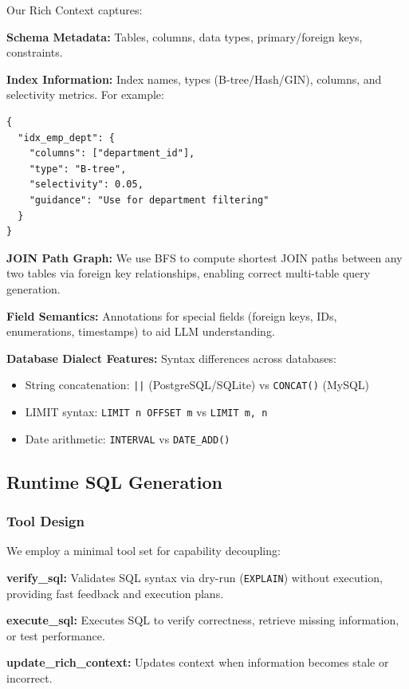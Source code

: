 Our Rich Context captures:

\textbf{Schema Metadata:} Tables, columns, data types, primary/foreign keys, constraints.

\textbf{Index Information:} Index names, types (B-tree/Hash/GIN), columns, and selectivity metrics. For example:
\begin{verbatim}
{
  "idx_emp_dept": {
    "columns": ["department_id"],
    "type": "B-tree",
    "selectivity": 0.05,
    "guidance": "Use for department filtering"
  }
}
\end{verbatim}

\textbf{JOIN Path Graph:} We use BFS to compute shortest JOIN paths between any two tables via foreign key relationships, enabling correct multi-table query generation.

\textbf{Field Semantics:} Annotations for special fields (foreign keys, IDs, enumerations, timestamps) to aid LLM understanding.

\textbf{Database Dialect Features:} Syntax differences across databases:
\begin{itemize}
    \item String concatenation: \texttt{||} (PostgreSQL/SQLite) vs \texttt{CONCAT()} (MySQL)
    \item LIMIT syntax: \texttt{LIMIT n OFFSET m} vs \texttt{LIMIT m, n}
    \item Date arithmetic: \texttt{INTERVAL} vs \texttt{DATE\_ADD()}
\end{itemize}

\subsection{Runtime SQL Generation}

\subsubsection{Tool Design}

We employ a minimal tool set for capability decoupling:

\textbf{verify\_sql:} Validates SQL syntax via dry-run (\texttt{EXPLAIN}) without execution, providing fast feedback and execution plans.

\textbf{execute\_sql:} Executes SQL to verify correctness, retrieve missing information, or test performance.

\textbf{update\_rich\_context:} Updates context when information becomes stale or incorrect.

